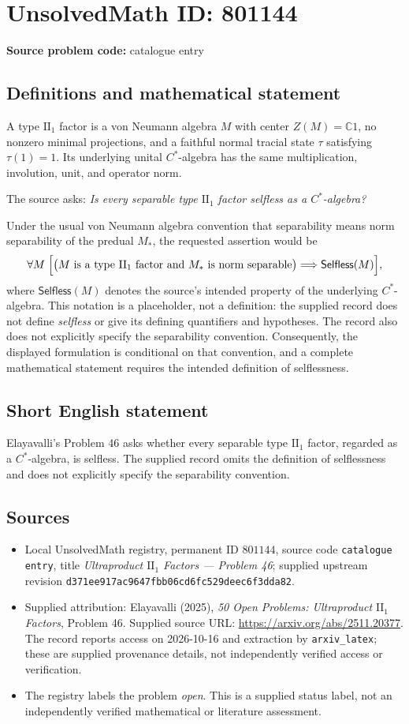 \documentclass[11pt]{article}
\newcommand{\C}{\mathbb{C}}
\begin{document}
\section*{UnsolvedMath ID: 801144}
\textbf{Source problem code:} catalogue entry
\subsection{Definitions and mathematical statement}
A type \(\mathrm{II}_1\) factor is a von Neumann algebra \(M\) with center \(Z(M)=\C 1\), no nonzero minimal projections, and a faithful normal tracial state \(\tau\) satisfying \(\tau(1)=1\). Its underlying unital \(C^*\)-algebra has the same multiplication, involution, unit, and operator norm.

The source asks: \emph{Is every separable type \(\mathrm{II}_1\) factor selfless as a \(C^*\)-algebra?}

Under the usual von Neumann algebra convention that separability means norm separability of the predual \(M_*\), the requested assertion would be
\[
\forall M\;\Bigl[\bigl(M\text{ is a type }\mathrm{II}_1\text{ factor and }M_*\text{ is norm separable}\bigr)\Longrightarrow \mathsf{Selfless}(M)\Bigr],
\]
where \(\mathsf{Selfless}(M)\) denotes the source's intended property of the underlying \(C^*\)-algebra. This notation is a placeholder, not a definition: the supplied record does not define \emph{selfless} or give its defining quantifiers and hypotheses. The record also does not explicitly specify the separability convention. Consequently, the displayed formulation is conditional on that convention, and a complete mathematical statement requires the intended definition of selflessness.
\subsection{Short English statement}
Elayavalli's Problem 46 asks whether every separable type \(\mathrm{II}_1\) factor, regarded as a \(C^*\)-algebra, is selfless. The supplied record omits the definition of selflessness and does not explicitly specify the separability convention.
\subsection{Sources}
\begin{itemize}
\item Local UnsolvedMath registry, permanent ID \(801144\), source code \texttt{catalogue entry}, title \emph{Ultraproduct \(\mathrm{II}_1\) Factors --- Problem 46}; supplied upstream revision \texttt{d371ee917ac9647fbb06cd6fc529deec6f3dda82}.
\item Supplied attribution: Elayavalli (2025), \emph{50 Open Problems: Ultraproduct \(\mathrm{II}_1\) Factors}, Problem 46. Supplied source URL: \url{https://arxiv.org/abs/2511.20377}. The record reports access on 2026-10-16 and extraction by \texttt{arxiv\_latex}; these are supplied provenance details, not independently verified access or verification.
\item The registry labels the problem \emph{open}. This is a supplied status label, not an independently verified mathematical or literature assessment.
\end{itemize}
\end{document}
